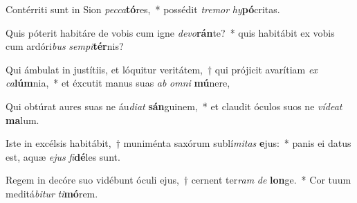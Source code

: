 \item Contérriti sunt in Sion \textit{pec}\textit{ca}\textbf{tó}res,~* possédit \textit{tre}\textit{mor} \textit{hy}\textbf{pó}critas.
\item Quis póterit habitáre de vobis cum igne \textit{de}\textit{vo}\textbf{rán}te?~* quis habitábit ex vobis cum ardóri\textit{bus} \textit{sem}\textit{pi}\textbf{tér}nis?
\item Qui ámbulat in justítiis, et lóquitur veritátem,~† qui prójicit avarítiam \textit{ex} \textit{ca}\textbf{lúm}nia,~* et éxcutit manus suas \textit{ab} \textit{om}\textit{ni} \textbf{mú}nere,
\item Qui obtúrat aures suas ne áu\textit{di}\textit{at} \textbf{sán}guinem,~* et claudit óculos suos ne \textit{ví}\textit{de}\textit{at} \textbf{ma}lum.
\item Iste in excélsis habitábit,~† muniménta saxórum sublí\textit{mi}\textit{tas} \textbf{e}jus:~* panis ei datus est, aquæ \textit{e}\textit{jus} \textit{fi}\textbf{dé}les sunt.
\item Regem in decóre suo vidébunt óculi ejus,~† cernent ter\textit{ram} \textit{de} \textbf{lon}ge.~* Cor tuum meditá\textit{bi}\textit{tur} \textit{ti}\textbf{mó}rem.
